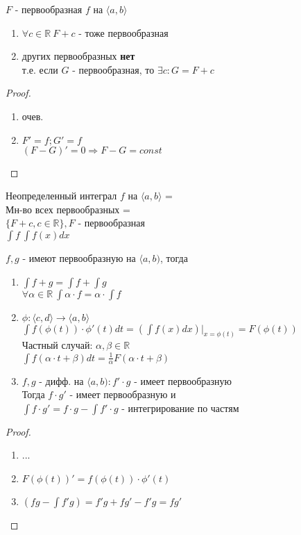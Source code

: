 \documentclass[12pt]{article}
\begin{document}
\begin{theorem}
  $F$ - первообразная $f$ на $\langle a, b \rangle$
  \begin{enumerate}
  \item $\forall c \in \mathbb{R}\ F + c$ - тоже первообразная
  \item других первообразных \textbf{нет} \\
    т.е. если $G$ - первообразная, то $\exists c: G = F + c$
  \end{enumerate}
  \begin{proof}
    \hfill \break
    \begin{enumerate}
    \item очев.
    \item $F' = f; G' = f$ \\
      $(F - G)' = 0 \Rightarrow F - G = const$
    \end{enumerate}
  \end{proof}
  \begin{definition}
    Неопределенный интеграл $f$ на $\langle a, b \rangle$ = \\
    Мн-во всех первообразных = \\
    $\{F + c, c \in \mathbb{R}\}, F$ - первообразная \\
    $\int{f}\ \int{f(x) dx}$
  \end{definition}
  \begin{theorem}
    $f, g$ - имеют первообразную на $\langle a, b)$, тогда \\
    \begin{enumerate}
    \item $\int f + g = \int f + \int g$ \\
      $\forall \alpha \in \mathbb{R}\ \int \alpha \cdot f = \alpha \cdot \int f$
    \item $\phi: \langle c, d \rangle \rightarrow \langle a, b \rangle$ \\
      $\int f(\phi (t)) \cdot \phi '(t) dt = (\int f(x) dx) \Big|_{x = \phi (t)} = F(\phi(t))$  \\
      Частный случай: $\alpha, \beta \in \mathbb{R}$ \\
      $\int f(\alpha \cdot t + \beta) dt = \frac{1}{\alpha}F(\alpha \cdot t + \beta)$
    \item $f, g$ - дифф. на $\langle a, b): f' \cdot g$ - имеет первообразную \\
      Тогда $f \cdot g'$ - имеет первообразную и \\
      $\int f \cdot g' = f \cdot g - \int f' \cdot g$ - интегрирование по частям
    \end{enumerate}
  \end{theorem}
  \begin{proof}
    \hfill \break
    \begin{enumerate}
    \item ...
    \item $F(\phi(t))' = f(\phi(t))\cdot \phi'(t)$
    \item $(fg - \int f'g) = f'g + fg' - f'g = fg'$
    \end{enumerate}
  \end{proof}
\end{theorem}
\end{document}
